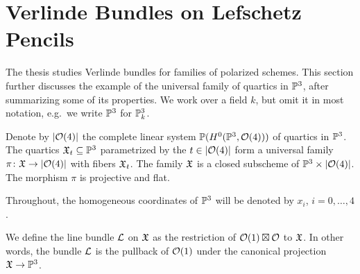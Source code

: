 \section{Verlinde Bundles on Lefschetz Pencils}


\newcommand{\schemeofquartics}{\abs{\mc{O}(4)}}

The thesis \cite{hemminghaus-verlinde-bundles} studies Verlinde bundles for
families of polarized schemes. This section further discusses the example of
the universal family of quartics in $\mathbb{P}^3$, after summarizing some of its
properties. We work over a field $k$, but omit it in most notation\footnotemark{}, e.g.\ we write $\mathbb{P}^3$ for $\mathbb{P}^3_k$.


Denote by $\schemeofquartics$ the complete linear system
$\mathbb{P}(H^0(\mathbb{P}^3, \mathcal{O}(4)))$
of quartics in $\mathbb{P}^3$. The quartics $\mathfrak{X}_t \subseteq \mathbb{P}^3$ parametrized by the $t\in\schemeofquartics$ form a universal family
$\pi \from \mf{X} \to \schemeofquartics$ with fibers $\mathfrak{X}_t$.
The family $\mathfrak{X}$ is a closed subscheme of
$\PP^3 \times \schemeofquartics$. The morphism $\pi$ is projective and flat. 


Throughout, the homogeneous coordinates of $\mathbb{P}^3$ will be denoted by
$x_i$, $i=0,\dotsc,4$.

We define the line bundle $\mathcal{L}$ on $\mathfrak{X}$ as the restriction of
$\mathcal{O}(1)\boxtimes\mathcal{O}$ to $\mathfrak{X}$. In other words\footnotemark{}, the bundle $\mathcal{L}$ is the pullback of
$\mathcal{O}(1)$ under the canonical projection $\mathfrak{X} \to \mathbb{P}^3$.



